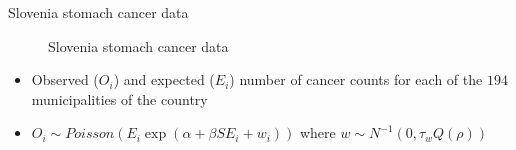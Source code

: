 \begin{frame}{Slovenia stomach cancer data}
	\begin{figure}[t!]
		\centering
		\caption{Slovenia stomach cancer data}
	\end{figure}
	\begin{itemize}
		\item Observed ($O_i$) and expected ($E_i$) number of cancer counts for each of the $194$ municipalities of the country
		\item $O_i \sim Poisson(E_i \exp(\alpha+\beta SE_i + w_i))$ 
		where $w \sim N^{-1}(0,\tau_w Q(\rho))$
	\end{itemize}
\end{frame}

